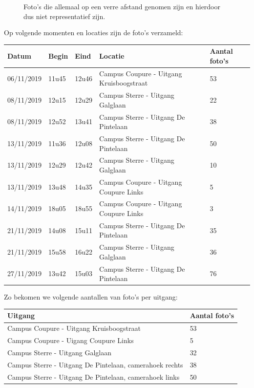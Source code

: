 \begin{figure}[h!]
\begin{subfigure}[b]{0.45\linewidth}
	\end{subfigure}
	\caption{Foto's die allemaal op een verre afstand genomen zijn en hierdoor dus niet representatief zijn.}
	\label{fig:onlyfar}
\end{figure}

Op volgende momenten en locaties zijn de foto's verzameld:
\begin{table}[h]
\centering
\begin{tabular}{l|l|l|l|l}
	Datum 		& Begin & Eind	& Locatie	& Aantal foto's \\ \hline
	06/11/2019	& 11u45 & 12u46	& Campus Coupure - Uitgang Kruisboogstraat	& 53	\\
	08/11/2019	& 12u15 & 12u29	& Campus Sterre - Uitgang Galglaan	& 22	\\
	08/11/2019	& 12u52 & 13u41	& Campus Sterre - Uitgang De Pintelaan	& 38	\\
	13/11/2019	& 11u36 & 12u08	& Campus Sterre - Uitgang De Pintelaan	& 50	\\
	13/11/2019	& 12u29 & 12u42	& Campus Sterre - Uitgang Galglaan	& 10	\\
	13/11/2019	& 13u48 & 14u35	& Campus Coupure - Uitgang Coupure Links	& 5	\\
	14/11/2019	& 18u05 & 18u55	& Campus Coupure - Uitgang Coupure Links	& 3	\\
	21/11/2019	& 14u08 & 15u11	& Campus Sterre - Uitgang De Pintelaan	& 35	\\
	21/11/2019	& 15u58 & 16u22	& Campus Sterre - Uitgang Galglaan	& 36	\\
	27/11/2019	& 13u42 & 15u03	& Campus Sterre - Uitgang De Pintelaan	& 76	\\
\end{tabular}
\end{table}

Zo bekomen we volgende aantallen van foto's per uitgang:
\begin{table}[h]
	\centering
	\begin{tabular}{l|l}
		Uitgang	& Aantal foto's \\ \hline
		Campus Coupure - Uitgang Kruisboogstraat	& 53\\
		Campus Coupure - Uigang Coupure Links	& 5\\
		Campus Sterre - Uitgang Galglaan	& 32\\
		Campus Sterre - Uitgang De Pintelaan, camerahoek rechts	& 38\\
		Campus Sterre - Uitgang De Pintelaan, camerahoek links	& 50\\
	\end{tabular}
\end{table}

